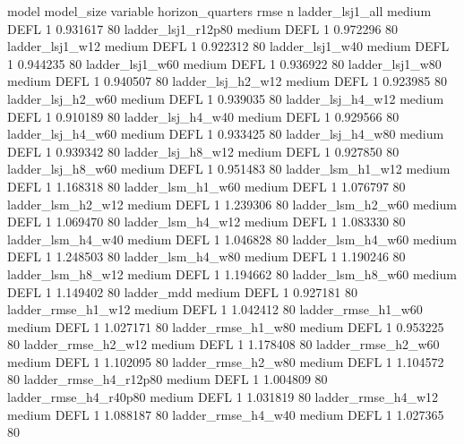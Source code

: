                  model model_size variable  horizon_quarters     rmse  n
       ladder_lsj1_all     medium     DEFL                 1 0.931617 80
    ladder_lsj1_r12p80     medium     DEFL                 1 0.972296 80
       ladder_lsj1_w12     medium     DEFL                 1 0.922312 80
       ladder_lsj1_w40     medium     DEFL                 1 0.944235 80
       ladder_lsj1_w60     medium     DEFL                 1 0.936922 80
       ladder_lsj1_w80     medium     DEFL                 1 0.940507 80
     ladder_lsj_h2_w12     medium     DEFL                 1 0.923985 80
     ladder_lsj_h2_w60     medium     DEFL                 1 0.939035 80
     ladder_lsj_h4_w12     medium     DEFL                 1 0.910189 80
     ladder_lsj_h4_w40     medium     DEFL                 1 0.929566 80
     ladder_lsj_h4_w60     medium     DEFL                 1 0.933425 80
     ladder_lsj_h4_w80     medium     DEFL                 1 0.939342 80
     ladder_lsj_h8_w12     medium     DEFL                 1 0.927850 80
     ladder_lsj_h8_w60     medium     DEFL                 1 0.951483 80
     ladder_lsm_h1_w12     medium     DEFL                 1 1.168318 80
     ladder_lsm_h1_w60     medium     DEFL                 1 1.076797 80
     ladder_lsm_h2_w12     medium     DEFL                 1 1.239306 80
     ladder_lsm_h2_w60     medium     DEFL                 1 1.069470 80
     ladder_lsm_h4_w12     medium     DEFL                 1 1.083330 80
     ladder_lsm_h4_w40     medium     DEFL                 1 1.046828 80
     ladder_lsm_h4_w60     medium     DEFL                 1 1.248503 80
     ladder_lsm_h4_w80     medium     DEFL                 1 1.190246 80
     ladder_lsm_h8_w12     medium     DEFL                 1 1.194662 80
     ladder_lsm_h8_w60     medium     DEFL                 1 1.149402 80
            ladder_mdd     medium     DEFL                 1 0.927181 80
    ladder_rmse_h1_w12     medium     DEFL                 1 1.042412 80
    ladder_rmse_h1_w60     medium     DEFL                 1 1.027171 80
    ladder_rmse_h1_w80     medium     DEFL                 1 0.953225 80
    ladder_rmse_h2_w12     medium     DEFL                 1 1.178408 80
    ladder_rmse_h2_w60     medium     DEFL                 1 1.102095 80
    ladder_rmse_h2_w80     medium     DEFL                 1 1.104572 80
 ladder_rmse_h4_r12p80     medium     DEFL                 1 1.004809 80
 ladder_rmse_h4_r40p80     medium     DEFL                 1 1.031819 80
    ladder_rmse_h4_w12     medium     DEFL                 1 1.088187 80
    ladder_rmse_h4_w40     medium     DEFL                 1 1.027365 80
